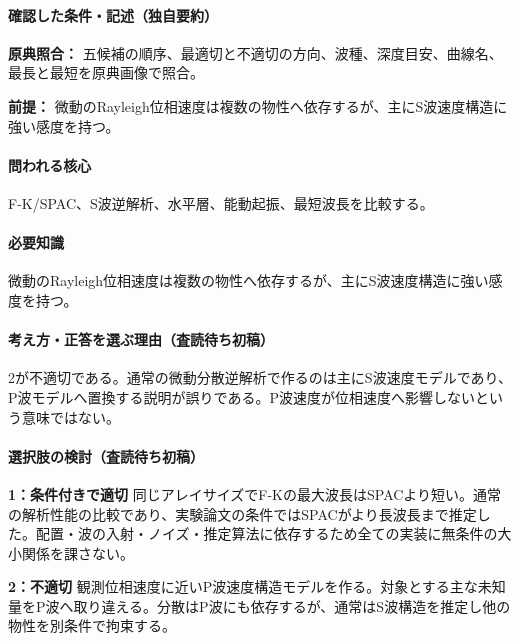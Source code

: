 \paragraph{確認した条件・記述（独自要約）}\mbox{}\par

\noindent\textbf{原典照合：} 五候補の順序、最適切と不適切の方向、波種、深度目安、曲線名、最長と最短を原典画像で照合。\par

\noindent\textbf{前提：} 微動のRayleigh位相速度は複数の物性へ依存するが、主にS波速度構造に強い感度を持つ。\par

\paragraph{問われる核心} F-K/SPAC、S波逆解析、水平層、能動起振、最短波長を比較する。

\paragraph{必要知識} 微動のRayleigh位相速度は複数の物性へ依存するが、主にS波速度構造に強い感度を持つ。

\paragraph{考え方・正答を選ぶ理由（査読待ち初稿）} 2が不適切である。通常の微動分散逆解析で作るのは主にS波速度モデルであり、P波モデルへ置換する説明が誤りである。P波速度が位相速度へ影響しないという意味ではない。

\paragraph{選択肢の検討（査読待ち初稿）}\mbox{}\par

\noindent\textbf{1：条件付きで適切} 同じアレイサイズでF-Kの最大波長はSPACより短い。通常の解析性能の比較であり、実験論文の条件ではSPACがより長波長まで推定した。配置・波の入射・ノイズ・推定算法に依存するため全ての実装に無条件の大小関係を課さない。\par

\noindent\textbf{2：不適切} 観測位相速度に近いP波速度構造モデルを作る。対象とする主な未知量をP波へ取り違える。分散はP波にも依存するが、通常はS波構造を推定し他の物性を別条件で拘束する。\par

